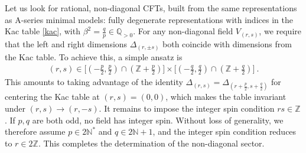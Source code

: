 \documentclass[12pt, a4paper]{article}
\theoremstyle{break}
\begin{document}
Let us look for rational, non-diagonal CFTs, built from the same representations as A-series minimal models: fully degenerate representations with indices in the Kac table \eqref{kac}, with $\beta^2=\frac{q}{p}\in\mathbb{Q}_{>0}$. For any non-diagonal field $V_{(r,s)}$, we require that the left and right dimensions $\Delta_{(r,\pm s)}$ both coincide with dimensions from the Kac table. To achieve this, a simple ansatz is 
\begin{align}
 (r,s) \in \Big[\left(-\tfrac{p}{2},\tfrac{p}{2}\right) \cap \left(\mathbb{Z}+\tfrac{p}{2}\right)\Big] \times \Big[\left(-\tfrac{q}{2},\tfrac{q}{2}\right) \cap \left(\mathbb{Z}+\tfrac{q}{2}\right)\Big] \ . 
\end{align}
This amounts to taking advantage of the identity $\Delta_{(r,s)}=\Delta_{(r+\frac{p}{2},s+\frac{q}{2})}$ for centering the Kac table at $(r,s)=(0,0)$, which makes the table invariant under $(r,s)\to (r,-s)$. It remains to impose the integer spin condition $rs\in\mathbb{Z}$. If $p,q$ are both odd, no field has integer spin. Without loss of generality, we therefore assume $p\in 2\mathbb{N}^*$ and $q\in 2\mathbb{N}+1$, 
and the integer spin condition reduces to $r\in 2\mathbb{Z}$. This completes the determination of the non-diagonal sector. 
\end{document}
